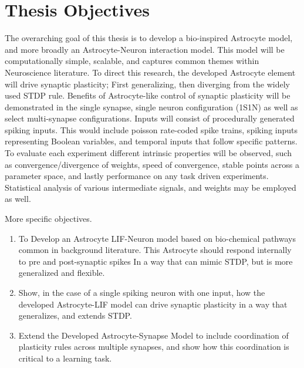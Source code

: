 \section{Thesis Objectives}
The overarching goal of this thesis is to develop a bio-inspired Astrocyte
model, and more broadly an Astrocyte-Neuron interaction model. This model will
be computationally simple, scalable, and captures common themes within
Neuroscience literature. To direct this research, the developed Astrocyte
element will drive synaptic plasticity; First generalizing, then diverging from
the widely used STDP rule. Benefits of Astrocyte-like control of synaptic
plasticity will be demonstrated in the single synapse, single neuron
configuration (1S1N) as well as select multi-synapse configurations. Inputs will
consist of procedurally generated spiking inputs. This would include poisson
rate-coded spike trains, spiking inputs representing Boolean variables, and
temporal inputs that follow specific patterns. To evaluate each experiment
different intrinsic properties will be observed, such as convergence/divergence
of weights, speed of convergence, stable points across a parameter space, and
lastly performance on any task driven experiments. Statistical analysis of
various intermediate signals, and weights may be employed as well.

More specific objectives.
\begin{enumerate}
\item To Develop an Astrocyte LIF-Neuron model based on bio-chemical pathways
  common in background literature. This Astrocyte should respond internally to
  pre and post-synaptic spikes In a way that can mimic STDP, but is more
  generalized and flexible.

  \item Show, in the case of a single spiking neuron with one input, how the
    developed Astrocyte-LIF model can drive synaptic plasticity in a way that
    generalizes, and extends STDP.

  \item Extend the Developed Astrocyte-Synapse Model to include coordination of
    plasticity rules across multiple synapses, and show how this coordination is
    critical to a learning task.

\end{enumerate}
